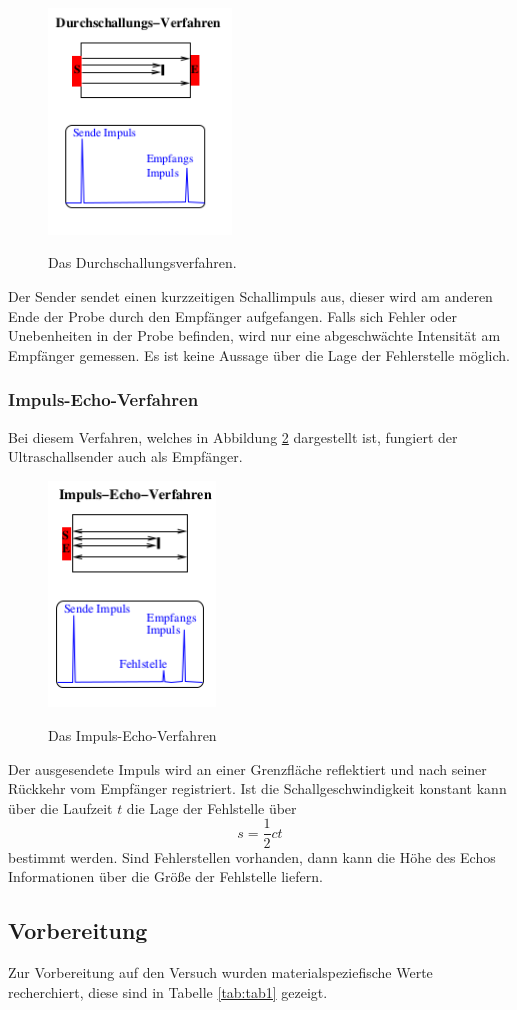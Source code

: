 \begin{figure}[H]
  \centering
  \includegraphics[height=6cm]{durch.png}
  \caption{Das Durchschallungsverfahren.}
  \label{fig:durch}
  \cite{skript}
\end{figure}

Der Sender sendet einen kurzzeitigen Schallimpuls aus, dieser wird am anderen Ende
der Probe durch den Empfänger aufgefangen. Falls sich Fehler oder Unebenheiten
in der Probe befinden, wird nur eine abgeschwächte Intensität am
Empfänger gemessen. Es ist keine Aussage über die Lage der Fehlerstelle
möglich.

\subsubsection{Impuls-Echo-Verfahren}
Bei diesem Verfahren, welches in Abbildung \ref{fig:echo}
dargestellt ist, fungiert der Ultraschallsender auch als Empfänger.

\begin{figure}[H]
  \centering
  \includegraphics[height=6cm]{echo.png}
  \caption{Das Impuls-Echo-Verfahren}
  \label{fig:echo}
  \cite{skript}
\end{figure}

Der ausgesendete Impuls wird an einer Grenzfläche reflektiert und nach seiner
Rückkehr vom Empfänger registriert. Ist die Schallgeschwindigkeit
konstant kann über die Laufzeit $t$ die Lage der Fehlstelle über
\begin{equation}
  s=\frac{1}{2}ct
  \label{strecke}
\end{equation}
bestimmt werden. Sind Fehlerstellen vorhanden, dann kann die Höhe des
Echos Informationen über die Größe der Fehlstelle liefern.


\subsection{Vorbereitung}
Zur Vorbereitung auf den Versuch wurden materialspeziefische Werte recherchiert, diese
sind in Tabelle \ref{tab:tab1} gezeigt.


